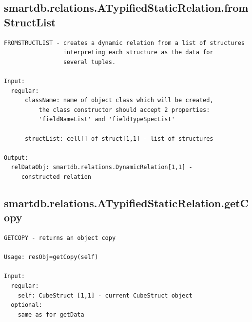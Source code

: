 \documentclass[letterpaper,10pt,english]{sphinxmanual}
\begin{document}
\subsection{smartdb.relations.ATypifiedStaticRelation.fromStructList}
\label{chap_functions:smartdb-relations-atypifiedstaticrelation-fromstructlist}
\begin{Verbatim}[commandchars=\\\{\}]
FROMSTRUCTLIST - creates a dynamic relation from a list of structures
                 interpreting each structure as the data for
                 several tuples.

Input:
  regular:
      className: name of object class which will be created,
          the class constructor should accept 2 properties:
          'fieldNameList' and 'fieldTypeSpecList'

      structList: cell[] of struct[1,1] - list of structures

Output:
  relDataObj: smartdb.relations.DynamicRelation[1,1] -
     constructed relation
\end{Verbatim}


\subsection{smartdb.relations.ATypifiedStaticRelation.getCopy}
\label{chap_functions:smartdb-relations-atypifiedstaticrelation-getcopy}
\begin{Verbatim}[commandchars=\\\{\}]
GETCOPY - returns an object copy

Usage: resObj=getCopy(self)

Input:
  regular:
    self: CubeStruct [1,1] - current CubeStruct object
  optional:
    same as for getData
\end{Verbatim}
\end{document}
